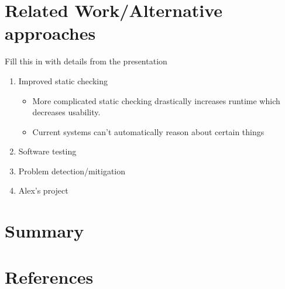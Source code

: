 \documentclass{article}
\begin{document}
\section{Related Work/Alternative approaches}
Fill this in with details from the presentation
\begin{enumerate}
    \item Improved static checking
    \begin{itemize}
        \item More complicated static checking drastically increases runtime which decreases usability.
        \item Current systems can't automatically reason about certain things
    \end{itemize}
    
    \item Software testing
    
    \item Problem detection/mitigation
    
    \item Alex's project
    
\end{enumerate}

\section{Summary}

\section{References}
\end{document}
